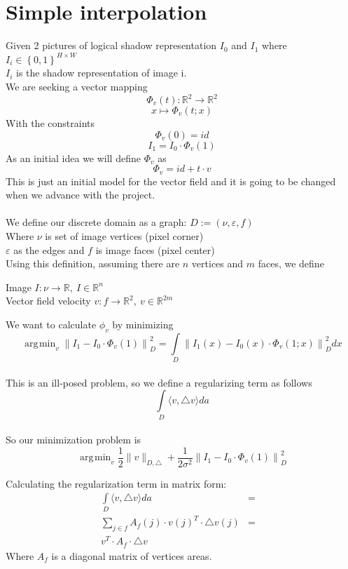 \documentclass[12pt]{article}
\DeclareMathOperator*{\argmin}{\arg\!\min}
\begin{document}
\section{Simple interpolation }
Given 2 pictures of logical shadow representation $I_0$ and $I_1$ where
$I_i \in \left\{ 0,1 \right\} ^ {H \times W}$ \\
$I_i$ is the shadow representation of image i. \\
We are seeking a vector mapping $$\Phi _v(t):\mathbb{R}^2\rightarrow\mathbb{R}^2$$
  $$ x\mapsto\Phi _v(t;x)$$
  With the constraints
$$\Phi _v(0) = id$$
$$I_1=I_0\cdot\Phi _v(1)$$
As an initial idea we will define $\Phi _v$ as 
$$\Phi _v = id + t \cdot v$$
This is just an initial model for the vector field and it is going to be changed when we advance with the project.
\\
\\
We define our discrete domain as a graph: $D:=(\nu,\varepsilon,f)$ \\
Where $\nu$ is set of image vertices (pixel corner) \\
$\varepsilon$ as the edges
and $f$ is image faces (pixel center)
\\
Using this definition, assuming there are $n$ vertices and $m$ faces, we define

\begin{center}
Image $I:\nu \rightarrow \mathbb{R} ,\ I \in \mathbb{R}^n $ \\
Vector field velocity $v:f \rightarrow \mathbb{R}^2 ,\ v \in \mathbb{R}^{2m} $
\end{center}

We want to calculate $\phi_v$ by minimizing 
$$ \argmin _v {\|I_1 - I_0 \cdot \Phi _v(1) \|}^2_D =
	\int \limits_D {\|I_1(x) - I_0(x) \cdot \Phi _v(1;x) \|}^2_D dx
$$
\\
This is an ill-posed problem, so we define a regularizing term as follows
$$ \int \limits_D \langle v, \triangle v \rangle da $$
\\
So our minimization problem is
$$ \displaystyle{ \argmin _v \frac{1}{2} \|v\|_{D,\triangle}  + \frac{1}{2 \sigma^2} {\|I_1 - I_0 \cdot \Phi _v(1) \|}^2_D }$$

\newpage
Calculating the regularization term in matrix form:
\begin{eqnarray}
\int \limits_D \langle v, \triangle v \rangle da &=& \\
\sum \limits_{j \in f} A_f(j) \cdot v(j)^T \cdot \triangle v(j) &=& \\
v^T \cdot A_f \cdot \triangle v
\end{eqnarray}
Where $A_f$ is a diagonal matrix of vertices areas. \\
\end{document}
